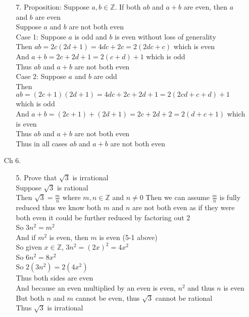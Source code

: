 \documentclass[sigconf]{article}
\begin{document}
\begin{itemize}
\begin{itemize}
      \item[7.] Proposition: Suppose $a,b\in\mathbb{Z}$. If both $ab$ and $a+b$ are even, then $a$ and $b$ are even\\
                Suppose $a$ and $b$ are not both even\\
                Case 1: Suppose $a$ is odd and $b$ is even without loss of generality \\
                Then $ab=2c(2d+1)=4dc+2c=2(2dc+c)$ which is even\\
                And $a+b=2c+2d+1=2(c+d)+1$ which is odd\\
                Thus $ab$ and $a+b$ are not both even\\
                Case 2: Suppose $a$ and $b$ are odd\\
                Then $ab=(2c+1)(2d+1)=4dc+2c+2d+1=2(2cd+c+d)+1$ which is odd\\
                And $a+b=(2c+1)+(2d+1)=2c+2d+2=2(d+c+1)$ which is even\\
                Thus $ab$ and $a+b$ are not both even\\
                Thus in all cases $ab$ and $a+b$ are not both even\\


    \end{itemize}
  \item[Ch 6.] \begin{itemize} %
      \item[5.] Prove that $\sqrt{3}$ is irrational\\
                Suppose $\sqrt{3}$ is rational\\
                Then $\sqrt{3}=\frac{m}{n}$ where $m,n\in\mathbb{Z}$ and $n\neq 0$
                Then we can assume $\frac{m}{n}$ is fully reduced thus we know both $m$ and $n$ are not both even as if they were both even it could be further reduced by factoring out 2\\
                So $3n^2=m^2$\\
                And if $m^2$ is even, then $m$ is even (5-1 above)\\
                So given $x\in\mathbb{Z}$, $3n^2=(2x)^2=4x^2$\\
                So $6n^2=8x^2$\\
                So $2(3n^2)=2(4x^2)$\\
                Thus both sides are even\\
                And because an even multiplied by an even is even, $n^2$ and thus $n$ is even\\
                But both $n$ and $m$ cannot be even, thus $\sqrt{3}$ cannot be rational\\
                Thus $\sqrt{3}$ is irrational\\


\end{itemize}
\end{itemize}
\end{document}
